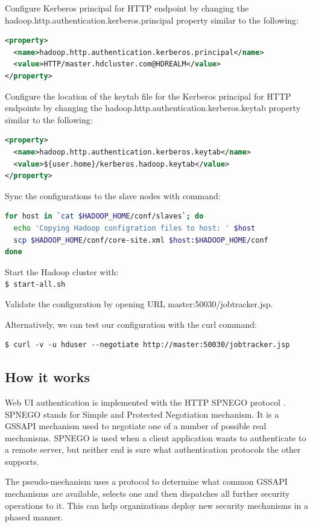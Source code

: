 Configure Kerberos principal for HTTP endpoint by changing the hadoop.http.authentication.kerberos.principal property similar to the following:
\lstset{style=bashstyle}
\begin{lstlisting}[language=XML]
<property>
  <name>hadoop.http.authentication.kerberos.principal</name>
  <value>HTTP/master.hdcluster.com@HDREALM</value>
</property>
\end{lstlisting}

Configure the location of the keytab file for the Kerberos principal for HTTP endpoints by changing the hadoop.http.authentication.kerberos.keytab property similar to the following:
\lstset{style=bashstyle}
\begin{lstlisting}[language=XML]
<property>
  <name>hadoop.http.authentication.kerberos.keytab</name>
  <value>${user.home}/kerberos.hadoop.keytab</value>
</property>
\end{lstlisting}

Sync the configurations to the slave nodes with command:
\lstset{style=bashstyle}
\begin{lstlisting}[language=bash]
for host in `cat $HADOOP_HOME/conf/slaves`; do
  echo 'Copying Hadoop configration files to host: ' $host
  scp $HADOOP_HOME/conf/core-site.xml $host:$HADOOP_HOME/conf
done
\end{lstlisting}

Start the Hadoop cluster with: \\
\verb|$ start-all.sh|

Validate the configuration by opening URL master:50030/jobtracker.jsp.

Alternatively, we can test our configuration with the curl command:
\lstset{style=bashstyle}
\begin{lstlisting}
$ curl -v -u hduser --negotiate http://master:50030/jobtracker.jsp 
\end{lstlisting}

\subsection*{How it works}
Web UI authentication is implemented with the HTTP SPNEGO protocol . SPNEGO stands for Simple and Protected Negotiation mechanism. It is a GSSAPI mechanism used to negotiate one of a number of possible real mechanisms. SPNEGO is used when a client application wants to authenticate to a remote server, but neither end is sure what authentication protocols the other supports.

The pseudo-mechanism uses a protocol to determine what common GSSAPI mechanisms are available, selects one and then dispatches all further security operations to it. This can help organizations deploy new security mechanisms in a phased manner.

